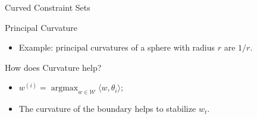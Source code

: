 \documentclass[final]{beamer} %
\newcommand{\cW}{\mathcal{W}}
\newcommand{\ip}[1]{\langle#1\rangle}
\DeclareMathOperator*{\argmax}{argmax}
\begin{document}
\begin{frame}[c]
\begin{columns}[t,totalwidth=\textwidth]
\begin{column}{.24\textwidth}
\begin{block}{Curved Constraint Sets}
\begin{minipage}{.9\linewidth}
\begin{block}{Principal Curvature}
\begin{itemize}
\begin{itemize}
							\smallskip
							\item Example: principal curvatures of a sphere with radius $r$ are $1/r$.
						\end{itemize}
					\end{itemize}
				\end{block}
			\end{minipage}
			\begin{minipage}{0.95\textwidth}
				\begin{block}{How does Curvature help?}
					\vspace{-0.5cm}
					\begin{minipage}[b]{0.5\textwidth}
						\begin{itemize}
							\item $w^{(i)} = {\displaystyle \argmax_{w\in\cW}} \ip{w,\theta_i}$;\vspace{0.2cm}
							\item The curvature of the boundary helps to stabilize $w_t$.\vspace{1cm}
						\end{itemize}
					\end{minipage}
					\begin{minipage}[b]{0.4\textwidth}

\end{minipage}
\end{block}
\end{minipage}
\end{block}
\end{column}
\end{columns}
\end{frame}
\end{document}
